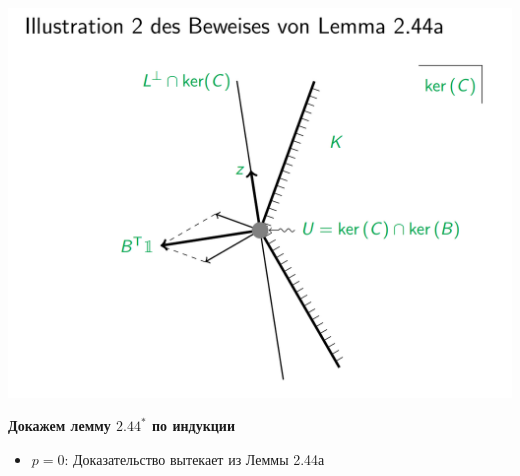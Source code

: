 \begin{center}
\includegraphics[scale=0.4]{lm244a2.png}
\end{center}
\newpage
\noindent\textbf{Докажем лемму $2.44^{\ast}$ по индукции}\\
\begin{itemize}
\item $p=0$: Доказательство вытекает из Леммы 2.44а
\end{itemize}
